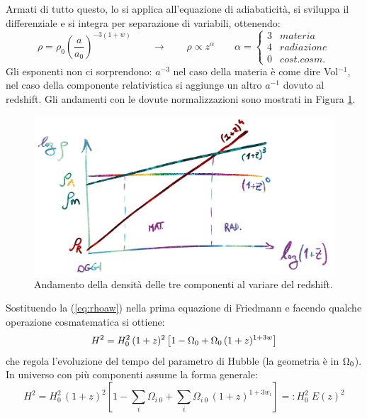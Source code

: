 Armati di tutto questo, lo si applica all'equazione di adiabaticità, si sviluppa il differenziale e si integra per separazione di variabili, ottenendo:
\begin{equation}
    \rho=\rho_0 \left ( \frac{a}{a_0}\right )^{-3(1+w)}\qquad\rightarrow \qquad \rho \propto z^\alpha \qquad \alpha =
\left\{\begin{matrix}
3 & materia\\
4 & radiazione\\
0 & cost. cosm.
\end{matrix}\right.
\label{eq:rhoaw} \end{equation}
Gli esponenti non ci sorprendono: $a^{-3}$ nel caso della materia è come dire Vol$^{-1}$, nel caso della componente relativistica si aggiunge un altro $a^{-1}$ dovuto al redshift. Gli andamenti con le dovute normalizzazioni sono mostrati in Figura \ref{fig:2rhored}.

\begin{figure}[h]
    \centering
    \includegraphics[width=.8\textwidth]{Pictures/2/logrho-z.jpg}
    \caption{Andamento della densità delle tre componenti al variare del redshift.}
    \label{fig:2rhored}
\end{figure}
Sostituendo la (\ref{eq:rhoaw}) nella prima equazione di Friedmann e facendo qualche operazione cosmatematica si ottiene:
\begin{equation}
    H^2=H_0^2\,(1+z)^2\left [ 1-\Omega_0 + \Omega_0 \,(1+z)^{1+3w} \right ] \label{eq:hevol}
\end{equation}
che regola l'evoluzione del tempo del parametro di Hubble (la geometria è in $\Omega_0$). In universo con più componenti assume la forma generale:
\begin{equation}
    H^2=H_0^2\,(1+z)^2\left [ 1-\sum_{i}\Omega_{i\: 0} + \sum_{i}\Omega_{i\: 0} \,(1+z)^{1+3w_i} \right ] =: H_0^2\; E(z)^2 \label{eq:hevolmulti}
\end{equation}
 


